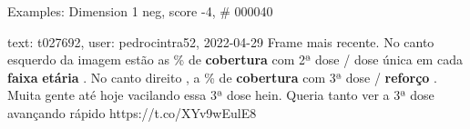 \begin{frame}{Examples: Dimension 1 neg, score -4, \# 000040}
\footnotesize
\begin{alertblock}{text: t027692, user: pedrocintra52, 2022-04-29}
Frame mais recente. No canto esquerdo  da imagem estão as \% 
de \textbf{cobertura} com 2ª dose / dose única em cada \textbf{faixa} 
\textbf{etária} . No canto direito  , a \% de 
\textbf{cobertura} com 3ª dose / \textbf{reforço} . Muita gente até hoje 
vacilando essa 3ª dose hein. Queria tanto ver a 3ª dose avançando rápido 
\textbf{} https://t.co/XYv9wEulE8 
\end{alertblock}
\end{frame}
